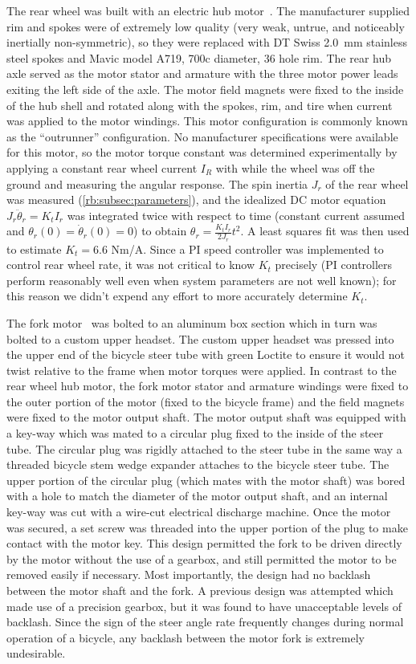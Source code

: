 The rear wheel was built with an electric hub motor~\cite{AmpedBikes}. The
manufacturer supplied rim and spokes were of extremely low quality (very weak,
untrue, and noticeably inertially non-symmetric), so they were replaced with DT
Swiss \SI{2.0}{\mm} stainless steel spokes and Mavic model A719, 700c diameter, 36 hole
rim. The rear hub axle served as the motor stator and armature with the three
motor power leads exiting the left side of the axle. The motor field magnets
were fixed to the inside of the hub shell and rotated along with the spokes,
rim, and tire when current was applied to the motor windings. This motor
configuration is commonly known as the ``outrunner'' configuration. No
manufacturer specifications were available for this motor, so the motor torque
constant was determined experimentally by applying a constant rear wheel
current $I_R$ with while the wheel was off the ground and measuring the angular
response. The spin inertia $J_r$ of the rear wheel was measured
(\autoref{rb:subsec:parameters}), and the idealized DC motor equation
$J_r\ddot{\theta}_r = K_t I_r$ was integrated twice with respect to time
(constant current assumed and $\theta_r(0)=\dot{\theta}_r(0) = 0$) to obtain
$\theta_r = \frac{K_t I_r}{2J_r}t^2$. A least squares fit was then used to
estimate $K_t=6.6$ Nm/A. Since a PI speed controller was implemented to control
rear wheel rate, it was not critical to know $K_t$ precisely (PI controllers
perform reasonably well even when system parameters are not well known); for
this reason we didn't expend any effort to more accurately determine $K_t$.

The fork motor~\cite{TeknicM3441} was bolted to an aluminum box section which
in turn was bolted to a custom upper headset. The custom upper headset was
pressed into the upper end of the bicycle steer tube with green Loctite to
ensure it would not twist relative to the frame when motor torques were
applied. In contrast to the rear wheel hub motor, the fork motor stator and
armature windings were fixed to the outer portion of the motor (fixed to the
bicycle frame) and the field magnets were fixed to the motor output shaft.  The
motor output shaft was equipped with a key-way which was mated to a circular
plug fixed to the inside of the steer tube. The circular plug was rigidly
attached to the steer tube in the same way a threaded bicycle stem wedge
expander attaches to the bicycle steer tube. The upper portion of the circular
plug (which mates with the motor shaft) was bored with a hole to match the
diameter of the motor output shaft, and an internal key-way was cut with a
wire-cut electrical discharge machine. Once the motor was secured, a set
screw was threaded into the upper portion of the plug to make contact with the
motor key. This design permitted the fork to be driven directly by the motor
without the use of a gearbox, and still permitted the motor to be removed
easily if necessary. Most importantly, the design had no backlash between the
motor shaft and the fork. A previous design was attempted which made use of a
precision gearbox, but it was found to have unacceptable levels of backlash.
Since the sign of the steer angle rate frequently changes during normal
operation of a bicycle, any backlash between the motor fork is extremely
undesirable.

